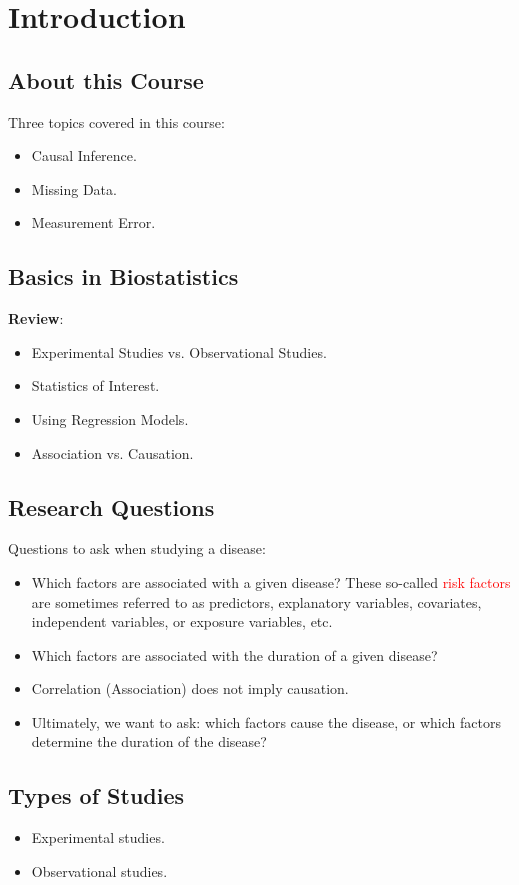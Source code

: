 \chapter{Introduction}
\section*{About this Course}
Three topics covered in this course:
\begin{itemize}
      \item Causal Inference.
      \item Missing Data.
      \item Measurement Error.
\end{itemize}
\section*{Basics in Biostatistics}
\textbf{Review}:
\begin{itemize}
      \item Experimental Studies vs. Observational Studies.
      \item Statistics of Interest.
      \item Using Regression Models.
      \item Association vs. Causation.
\end{itemize}
\section*{Research Questions}
Questions to ask when studying a disease:
\begin{itemize}
      \item Which factors are associated with a given disease? These
            so-called \textcolor{Red}{risk factors} are sometimes referred to as predictors,
            explanatory variables, covariates, independent variables, or
            exposure variables, etc.
      \item Which factors are associated with the duration of a given
            disease?
      \item Correlation (Association) does not imply causation.
      \item Ultimately, we want to ask: which factors cause the disease, or
            which factors determine the duration of the disease?
\end{itemize}
\section*{Types of Studies}
\begin{itemize}
      \item Experimental studies.
      \item Observational studies.
\end{itemize}
